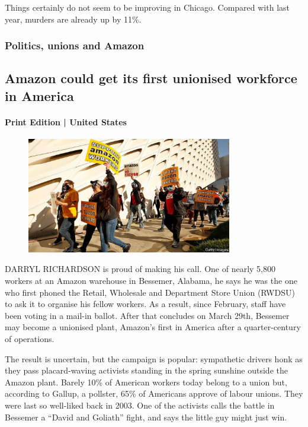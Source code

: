 \documentclass{article}
\begin{document}
Things certainly do not seem to be improving in Chicago. Compared with last year, murders are already up by 11\%. {} 
\clearpage
\subsubsection{Politics, unions and Amazon }
\subsection{Amazon could get its first unionised workforce in America }
\paragraph{Print Edition | United States  \quad \color{gray}{Mar 27th 2021 }}
\begin{figure}[h]
\centering
\includegraphics[width=0.8\textwidth]{images/20210327_usp503.jpg}
\end{figure}
\lettrine{D}ARRYL RICHARDSON is proud of making his call. One of nearly 5,800 workers at an Amazon warehouse in Bessemer, Alabama, he says he was the one who first phoned the Retail, Wholesale and Department Store Union (RWDSU) to ask it to organise his fellow workers. As a result, since February, staff have been voting in a mail-in ballot. After that concludes on March 29th, Bessemer may become a unionised plant, Amazon's first in America after a quarter-century of operations. 

The result is uncertain, but the campaign is popular: sympathetic drivers honk as they pass placard-waving activists standing in the spring sunshine outside the Amazon plant. Barely 10\% of American workers today belong to a union but, according to Gallup, a pollster, 65\% of Americans approve of labour unions. They were last so well-liked back in 2003. One of the activists calls the battle in Bessemer a ``David and Goliath'' fight, and says the little guy might just win. 
\end{document}
